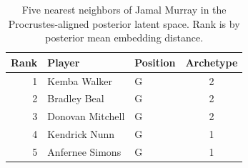 \begin{table}[htbp]
  \centering\small
  \begin{tabular}{rllc}
    \toprule
    Rank & Player & Position & Archetype \\
    \midrule
    1 & Kemba Walker & G & 2 \\
    2 & Bradley Beal & G & 2 \\
    3 & Donovan Mitchell & G & 2 \\
    4 & Kendrick Nunn & G & 1 \\
    5 & Anfernee Simons & G & 1 \\
    \bottomrule
  \end{tabular}
  \caption{Five nearest neighbors of Jamal Murray in the Procrustes-aligned posterior latent space. Rank is by posterior mean embedding distance.}
  \label{tab:Jamal_Murray_neighbors}
\end{table}

